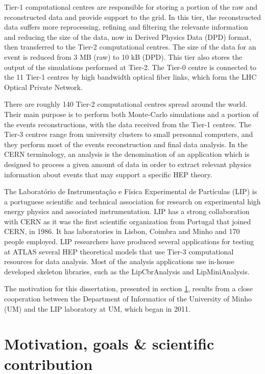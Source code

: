 Tier-1 computational centres are responsible for storing a portion of the raw and reconstructed data and provide support to the grid. In this tier, the reconstructed data suffers more reprocessing, refining and filtering the relevante information and reducing the size of the data, now in Derived Physics Data (DPD) format, then transferred to the Tier-2 computational centres. The size of the data for an event is reduced from 3 MB (raw) to 10 kB (DPD). This tier also stores the output of the simulations performed at Tier-2. The Tier-0 centre is connected to the 11 Tier-1 centres by high bandwidth optical fiber links, which form the LHC Optical Private Network.

There are roughly 140 Tier-2 computational centres spread around the world. Their main purpose is to perform both Monte-Carlo simulations and a portion of the events reconstructions, with the data received from the Tier-1 centres. The Tier-3 centres range from university clusters to small personnal computers, and they perform most of the events reconstruction and final data analysis. In the CERN terminology, an analysis is the denomination of an application which is designed to process a given amount of data in order to extract relevant physics information about events that may support a specific HEP theory.

The Laboratório de Instrumentação e Física Experimental de Partículas (LIP) \cite{LIP} is a portuguese scientific and technical association for research on experimental high energy physics and associated instrumentation. LIP has a strong collaboration with CERN as it was the first scientific organization from Portugal that joined CERN, in 1986. It has laboratories in Lisbon, Coimbra and Minho and 170 people employed. LIP researchers have produced several applications for testing at ATLAS several HEP theoretical models that use Tier-3 computational resources for data analysis. Most of the analysis applications use in-house developed skeleton libraries, such as the LipCbrAnalysis and LipMiniAnalysis.

The motivation for this dissertation, presented in section \ref{Motivation}, results from a close cooperation between the Department of Informatics of the University of Minho (UM) and the LIP laboratory at UM, which began in 2011.

\section{Motivation, goals \& scientific contribution}
\label{Motivation}


